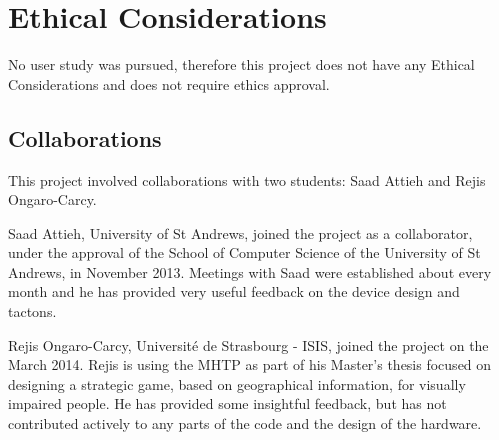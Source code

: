 \chapter{Ethical Considerations}

No user study was pursued, therefore this project does not have any Ethical Considerations and does not require ethics approval.\newline \par

\section{Collaborations}
This project involved collaborations with two students: Saad Attieh and Rejis Ongaro-Carcy.  

Saad Attieh, University of St Andrews, joined the project as a collaborator, under the approval of the School of Computer Science of the University of St Andrews, in November 2013. Meetings with Saad were established about every month and he has provided very useful feedback on the device design and tactons. 

Rejis Ongaro-Carcy, Université de Strasbourg - ISIS, joined the project on the  March 2014. Rejis is using the MHTP as part of his Master's thesis focused on designing a strategic game, based on geographical information, for visually impaired people. He has provided some insightful feedback, but has not contributed actively to any parts of the code and the design of the hardware. 